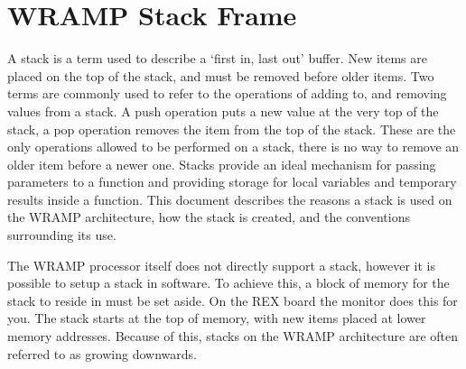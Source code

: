 %
%
\section{WRAMP Stack Frame}

A stack is a term used to describe a `first in, last out' buffer. New
items are placed on the top of the stack, and must be removed before
older items. Two terms are commonly used to refer to the operations of
adding to, and removing values from a stack. A push operation puts a
new value at the very top of the stack, a pop operation removes the
item from the top of the stack. These are the only operations allowed to
be performed on a stack, there is no way to remove an older item
before a newer one. Stacks provide an ideal mechanism for passing
parameters to a function and providing storage for local variables and
temporary results inside a function. This document describes the
reasons a stack is used on the WRAMP architecture, how the stack is
created, and the conventions surrounding its use.

The WRAMP processor itself does not directly support a stack, however
it is possible to setup a stack in software.  To achieve this, a block
of memory for the stack to reside in must be set aside. On the REX
board the monitor does this for you.  The stack starts at the top of
memory, with new items placed at lower memory addresses. Because of
this, stacks on the WRAMP architecture are often referred to as
growing downwards.

